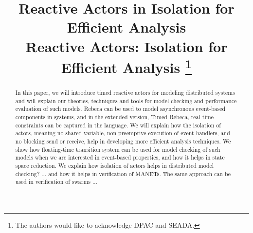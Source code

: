 \documentclass[conference]{IEEEtran}
\begin{document}
	
	\title{Reactive Actors in Isolation for Efficient Analysis 
	\\ Reactive Actors: Isolation for Efficient Analysis 
		\thanks{The authors would like to acknowledge DPAC and SEADA.}
	}
	
	\author{
		\and
		\and
	}
	
	\maketitle
	
	\begin{abstract}
		In this paper, we will introduce timed reactive actors for modeling distributed systems and will explain our theories, techniques and tools for model checking and performance evaluation of such models.  Rebeca can be used to model asynchronous event-based components in systems, and in the extended version, Timed Rebeca, real time constraints can be captured in the language. We will explain how the isolation of actors, meaning no shared variable, non-preemptive execution of event handlers, and no blocking send or receive, help in developing more efficient analysis techniques. We show how floating-time transition system can be used for model checking of such models when we are interested in event-based properties, and how it helps in state space reduction. We explain how isolation of actors helps in distributed model checking? ... and how it helps in verification of MANETs. The same approach can be used in verification of swarms ...
		
	\end{abstract}
	
\end{document}
